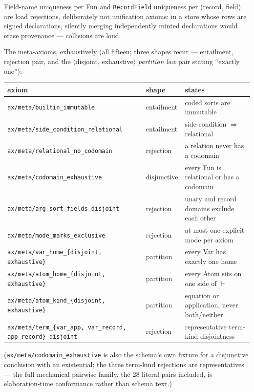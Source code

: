 Field-name uniqueness per
Fun and \texttt{RecordField} uniqueness per (record, field) are load
rejections, deliberately not unification axioms: in a store whose
rows are signed declarations, silently merging independently minted
declarations would erase provenance — collisions are loud.

The meta-axioms, exhaustively (all fifteen; three shapes recur —
entailment, rejection pair, and the $\langle$disjoint,
exhaustive$\rangle$ \emph{partition law} pair stating ``exactly
one''):

\begin{center}
\footnotesize
\begin{tabular}{lll}
\toprule
axiom & shape & states \\
\midrule
\texttt{ax/meta/builtin\_immutable} & entailment & coded sorts are immutable \\
\texttt{ax/meta/side\_condition\_relational} & entailment & side-condition $\Rightarrow$ relational \\
\texttt{ax/meta/relational\_no\_codomain} & rejection & a relation never has a codomain \\
\texttt{ax/meta/codomain\_exhaustive} & disjunctive & every Fun is relational or has a codomain \\
\texttt{ax/meta/arg\_sort\_fields\_disjoint} & rejection & unary and record domains exclude each other \\
\texttt{ax/meta/mode\_marks\_exclusive} & rejection & at most one explicit mode per axiom \\
\texttt{ax/meta/var\_home\_\{disjoint, exhaustive\}} & partition & every Var has exactly one home \\
\texttt{ax/meta/atom\_home\_\{disjoint, exhaustive\}} & partition & every Atom sits on one side of $\vdash$ \\
\texttt{ax/meta/atom\_kind\_\{disjoint, exhaustive\}} & partition & equation or application, never both/neither \\
\texttt{ax/meta/term\_\{var\_app, var\_record, app\_record\}\_disjoint} & rejection & representative term-kind disjointness \\
\bottomrule
\end{tabular}
\end{center}

\noindent (\texttt{ax/meta/codomain\_exhaustive} is also the schema's
own fixture for a disjunctive conclusion with an existential; the
three term-kind rejections are representatives — the full mechanical
pairwise family, the 28 literal pairs included, is elaboration-time
conformance rather than schema text.)

